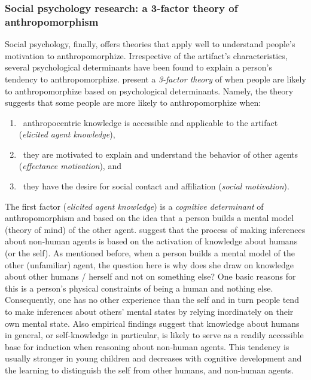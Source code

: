 \documentclass{frontiersSCNS} %
\begin{document}
\subsubsection{Social psychology research: a 3-factor theory of anthropomorphism\\}
\label{sec:psychological-factors}

Social psychology, finally, offers theories that apply well to understand
people's motivation to anthropomorphize. Irrespective of the artifact's
characteristics, several psychological determinants have been found to explain a
person's tendency to anthropomorphize. \cite{epley_seeing_2007} present a
\emph{3-factor theory} of when people are likely to anthropomorphize based on
psychological determinants. Namely, the theory suggests that some people are
more likely to anthropomorphize when: 

\begin{enumerate}

    \item ~anthropocentric knowledge is accessible and applicable to the
        artifact (\textit{elicited agent knowledge}),

    \item ~they are motivated to explain and understand the behavior of other
        agents (\textit{effectance motivation}), and

    \item ~they have the desire for social contact and affiliation
        (\textit{social motivation}).

\end{enumerate}

The first factor (\textit{elicited agent knowledge}) is a \emph{cognitive
determinant} of anthropomorphism and based on the idea that a person builds a
mental model (theory of mind) of the other agent. \citet{epley_seeing_2007}
suggest that the process of making inferences about non-human agents is based on
the activation of knowledge about humans (or the self). As mentioned before,
when a person builds a mental model of the other (unfamiliar) agent, the
question here is why does she draw on knowledge about other humans / herself and
not on something else? One basic reasons for this is a person's physical
constraints of being a human and nothing else. Consequently, one has no other
experience than the self and in turn people tend to make inferences about
others' mental states by relying inordinately on their own mental state.  Also
empirical findings suggest that knowledge about humans in general, or
self-knowledge in particular, is likely to serve as a readily accessible base
for induction when reasoning about non-human agents.  This tendency is usually
stronger in young children and decreases with cognitive development and the
learning to distinguish the self from other humans, and non-human agents. 
\end{document}
